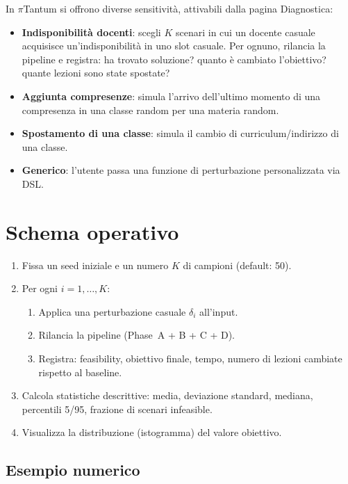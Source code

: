 In $\pi$Tantum si offrono diverse sensitivit\`a, attivabili
dalla pagina Diagnostica:

\begin{itemize}
\item \textbf{Indisponibilit\`a docenti}: scegli $K$ scenari
  in cui un docente casuale acquisisce un'indisponibilit\`a
  in uno slot casuale. Per ognuno, rilancia la pipeline e
  registra: ha trovato soluzione? quanto \`e cambiato
  l'obiettivo? quante lezioni sono state spostate?
\item \textbf{Aggiunta compresenze}: simula l'arrivo
  dell'ultimo momento di una compresenza in una classe
  random per una materia random.
\item \textbf{Spostamento di una classe}: simula il cambio
  di curriculum/indirizzo di una classe.
\item \textbf{Generico}: l'utente passa una funzione di
  perturbazione personalizzata via DSL.
\end{itemize}

\section{Schema operativo}

\begin{enumerate}
\item Fissa un seed iniziale e un numero $K$ di campioni
  (default: 50).
\item Per ogni $i = 1, \ldots, K$:
  \begin{enumerate}
  \item Applica una perturbazione casuale $\delta_i$
    all'input.
  \item Rilancia la pipeline (Phase~A + B + C + D).
  \item Registra: feasibility, obiettivo finale, tempo,
    numero di lezioni cambiate rispetto al baseline.
  \end{enumerate}
\item Calcola statistiche descrittive: media, deviazione
  standard, mediana, percentili 5/95, frazione di scenari
  infeasible.
\item Visualizza la distribuzione (istogramma) del valore
  obiettivo.
\end{enumerate}

\subsection{Esempio numerico}

